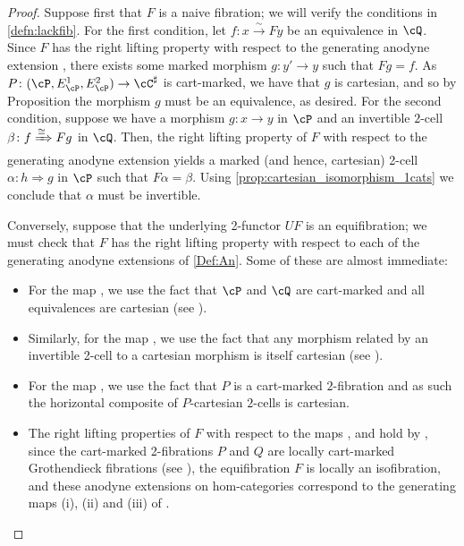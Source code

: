 \documentclass[11pt, dvipsnames]{amsart}
\begin{document}
		\begin{proof}
			Suppose first that $F$ is a naive fibration; we will verify the conditions in \cref{defn:lackfib}. For the first condition, let $f\colon x \xrightarrow{\sim} Fy$ be an equivalence in $\cQ$. Since $F$ has the right lifting property with respect to the generating anodyne extension , there exists some marked morphism $g\colon y'\to y$ such that $Fg=f$. As $P\colon(\cP,E^1_{\cP},E^2_{\cP})\to \cC^{\sharp}$ is cart-marked, we have that $g$ is cartesian, and so by Proposition  the morphism $g$ must be an equivalence, as desired. For the second condition, suppose we have a morphism $g\colon x\to y$ in $\cP$ and an invertible $2$-cell $\beta\colon f\xRightarrow{\cong} Fg$ in $\cQ$. Then, the right lifting property of $F$ with respect to the generating anodyne extension  yields a marked (and hence, cartesian) 2-cell $\alpha\colon h\Rightarrow g$ in $\cP$ such that $F\alpha=\beta$. Using \cref{prop:cartesian_isomorphism_1cats} we conclude that $\alpha$ must be invertible. 

			Conversely, suppose that the underlying 2-functor $UF$ is an equifibration; we must check that $F$ has the right lifting property with respect to each of the generating anodyne extensions of \cref{Def:An}. Some of these are almost immediate:
			
			\begin{itemize}[leftmargin=*]
				\item For the map , we use the fact that $\cP$ and $\cQ$ are cart-marked and all equivalences are cartesian (see \cite[Proposition 3.1.11]{Buckley2014}). 
                \item Similarly, for the map , we use the fact that any morphism related by an invertible 2-cell to a cartesian morphism is itself cartesian (see \cite[Proposition 3.1.8]{Buckley2014}). 
				\item For the map , we use the fact that $P$ is a cart-marked $2$-fibration and as such the horizontal composite of $P$-cartesian $2$-cells is cartesian. 
				\item The right lifting properties  of $F$ with respect to the maps ,   and  hold by \cite[Proposition 4.14]{mosersarazola2023model}, since the cart-marked 2-fibrations $P$ and $Q$ are locally cart-marked Grothendieck fibrations (see \cite[Definition 4.9]{mosersarazola2023model}), the equifibration $F$ is locally an isofibration, and these anodyne extensions on hom-categories correspond to the generating maps (i), (ii) and (iii) of \cite[Definition 4.11]{mosersarazola2023model}.
			\end{itemize}


\end{proof}
\end{document}
